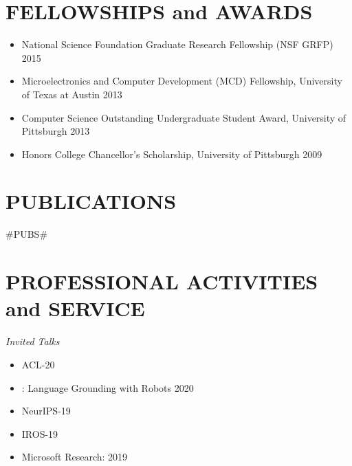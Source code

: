 \documentclass{res}
\newcommand{\citehref}[2]{\href{#1}{\color{darkblue}{#2}}}
\begin{document}
\begin{resume}
 \section{FELLOWSHIPS and AWARDS}

 \begin{itemize}
  \item National Science Foundation Graduate Research Fellowship (NSF GRFP) \hfill 2015
  \item Microelectronics and Computer Development (MCD) Fellowship, University of Texas at Austin \hfill 2013
  \item Computer Science Outstanding Undergraduate Student Award, University of Pittsburgh \hfill 2013
  \item Honors College Chancellor's Scholarship, University of Pittsburgh \hfill 2009
\end{itemize}

\section{PUBLICATIONS}

#PUBS#

\section{PROFESSIONAL ACTIVITIES and SERVICE}

{\sl Invited Talks}
  \begin{itemize}
    \item \citehref{https://sites.google.com/view/2ndnlp4convai/}{Workshop on NLP for Conversational AI} \hfill ACL-20
    \item \citehref{https://www.cs.princeton.edu/courses/archive/spring20/cos598C/}{Princeton COS 598C}: Language Grounding with Robots \hfill 2020
    \item \citehref{https://vigilworkshop.github.io/}{Visually Grounded Interaction and Language (ViGIL) Workshop} \hfill NeurIPS-19
    \item \citehref{https://sites.google.com/view/spar2019/speakers}{Semantic Policy and Action Representations for Autonomous Robots (SPAR) Workshop} \hfill IROS-19
    \item Microsoft Research: \citehref{https://www.youtube.com/watch?v=XL3FMpceYoE}{Vision-and-Dialog Navigation} \hfill 2019
  \end{itemize}


\end{resume}
\end{document}
